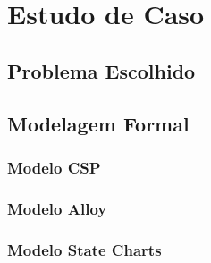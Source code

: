 \section{Estudo de Caso}

\subsection{Problema Escolhido}

\subsection{Modelagem Formal}

\subsubsection{Modelo CSP}
\subsubsection{Modelo Alloy}
\subsubsection{Modelo State Charts}
